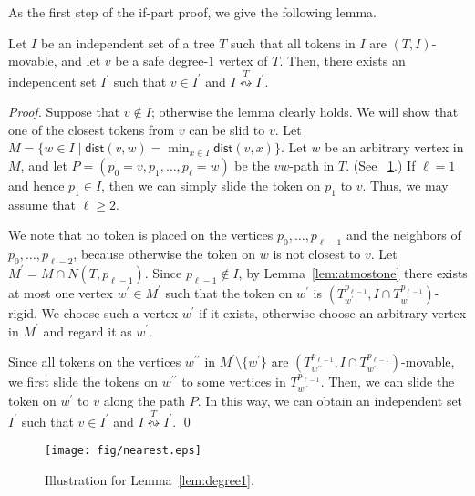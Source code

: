 \documentclass{llncs}
\newcommand{\Nei}[2]{N(#1,#2)}
\newcommand{\Tsub}[2]{T_{#1}^{#2}}
\newcommand{\bfI}{I}
\newcommand{\sevstep}{\leftrightsquigarrow}
\newcommand{\sevstepT}[1]{\overset{#1}{\sevstep}}
\newcommand{\bfIp}{\bfI^{\prime}}
\newcommand{\dist}{\mathsf{dist}}
\newcounter{one}
\begin{document}
	As the first step of the if-part proof, we give the following lemma. 
	\begin{lemma} \label{lem:degree1}
	Let $\bfI$ be an independent set of a tree $T$ such that all tokens in $\bfI$ are $(T, \bfI)$-movable, and let $v$ be a safe degree-$1$ vertex of $T$. 
	Then, there exists an independent set $\bfIp$ such that $v \in \bfIp$ and $\bfI \sevstepT{T} \bfIp$.
\end{lemma}
	\begin{proof}
	Suppose that $v \not\in \bfI$; otherwise the lemma clearly holds. 
	We will show that one of the closest tokens from $v$ can be slid to $v$.
	Let $M = \{w \in \bfI \mid \dist(v,w) = \min_{x \in \bfI} \dist(v,x)\}$.
	Let $w$ be an arbitrary vertex in $M$, and let $P = (p_{0} = v, p_{1}, \dots, p_{\ell} = w)$ be the $vw$-path in $T$.
(See \figurename~\ref{fig:nearest}.)
	If $\ell = 1$ and hence $p_1 \in \bfI$, then we can simply slide the token on $p_1$ to $v$. 
	Thus, we may assume that $\ell \ge 2$. 

	We note that no token is placed on the vertices $p_{0}, \dots, p_{\ell-1}$ and the neighbors of $p_{0}, \dots, p_{\ell-2}$, 
because otherwise the token on $w$ is not closest to $v$. 
	Let $M^\prime = M \cap \Nei{T}{p_{\ell-1}}$.
Since $p_{\ell -1} \not\in \bfI$, by Lemma~\ref{lem:atmostone} there exists at most one vertex $w^\prime \in M^\prime$ such that the token on $w^\prime$ is $(\Tsub{w^\prime}{p_{\ell-1}}, \bfI \cap \Tsub{w^\prime}{p_{\ell-1}})$-rigid. 
	We choose such a vertex $w^\prime$ if it exists, otherwise choose an arbitrary vertex in $M^\prime$ and regard it as $w^\prime$. 
	
	Since all tokens on the vertices $w^{\prime \prime}$ in $M^\prime \setminus \{w^\prime\}$ are $(\Tsub{w^{\prime \prime}}{p_{\ell-1}}, \bfI \cap \Tsub{w^{\prime \prime}}{p_{\ell-1}})$-movable, we first slide the tokens on $w^{\prime \prime}$ to some vertices in $\Tsub{w^{\prime \prime}}{p_{\ell-1}}$.
	Then, we can slide the token on $w^\prime$ to $v$ along the path $P$. 
	In this way, we can obtain an independent set $\bfI^\prime$ such that $v \in \bfIp$ and $\bfI \sevstepT{T} \bfIp$.
	\qed
	\end{proof}
\begin{figure}[t]
\begin{center}
	\texttt{[image: fig/nearest.eps]}
	\end{center}
	\vspace{-1em}
	\caption{Illustration for Lemma~\ref{lem:degree1}.}
	\label{fig:nearest}
\end{figure}
\end{document}
